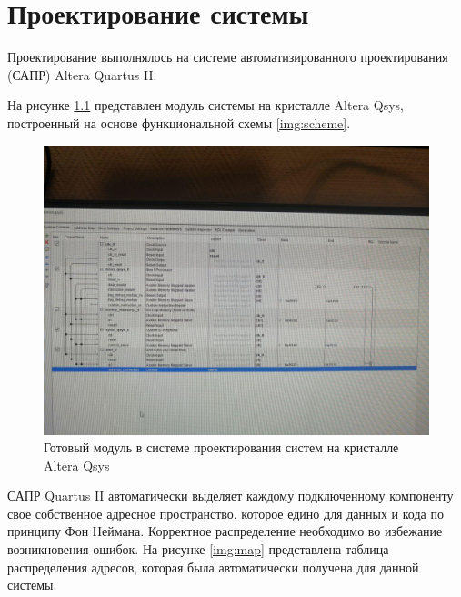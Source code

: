 \chapter{Проектирование системы}

Проектирование выполнялось на системе автоматизированного проектирования (САПР) Altera Quartus II.

На рисунке \ref{img:module} представлен модуль системы на кристалле Altera Qsys, построенный на основе функциональной схемы \ref{img:scheme}.

\begin{figure}[H]
	\begin{center}
		\includegraphics[scale=1.0]{img/module.jpg}
	\end{center}
	\captionsetup{justification=centering}
	\caption{Готовый модуль в системе проектирования систем на кристалле Altera Qsys}
	\label{img:module}
\end{figure}

САПР Quartus II автоматически выделяет каждому подключенному компоненту свое собственное адресное пространство, которое едино для данных и кода по принципу Фон Неймана. Корректное распределение необходимо во избежание возникновения ошибок. На рисунке \ref{img:map} представлена таблица распределения адресов, которая была автоматически получена для данной системы.

